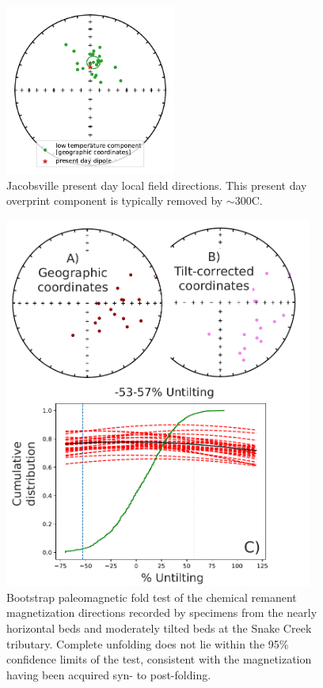 \begin{figure}
\centering
\includegraphics[width=0.5\textwidth]{figure/Zhang2024a/Jacobsville_pdf_directions.pdf}
\caption[Jacobsville Formation present day local field component]{Jacobsville present day local field directions. This present day overprint component is typically removed by $\sim$300\textdegree C.}
\label{fig:Jacobsville_pdf}
\end{figure}

\begin{figure}
\centering
\includegraphics[width=0.9\textwidth]{figure/Zhang2024a/SI_hct_fold_test.pdf}
\caption[Paleomagnetic fold test at the Snake Creek tributary of the Jacobsville Formation]{Bootstrap paleomagnetic fold test \citep{Tauxe1994a} of the chemical remanent magnetization directions recorded by specimens from the nearly horizontal beds and moderately tilted beds at the Snake Creek tributary. Complete unfolding does not lie within the 95\% confidence limits of the test, consistent with the magnetization having been acquired syn- to post-folding.}
\label{fig:Jacobsville_hct_fold_test}
\end{figure}

